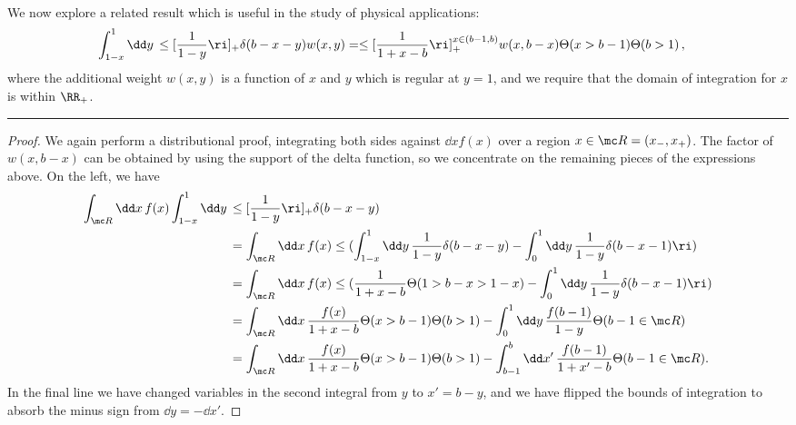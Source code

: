 ~\\
\begin{example}{}
    We now explore a related result which is useful in the study of physical applications:
    \begin{align}
        \int_{1-x}^{1} \dd y\,
        \le[\frac{1}{1-y}\ri]_+ \delta(b - x - y) w(x, y)
        &=
        \le[\frac{1}{1+x-b}\ri]^{x \in (b-1,b)}_+
        w(x, b-x)
        \Theta(x > b-1) \Theta(b > 1)
        \label{eq:mixed-bounds_1d_plus-distribution}
        \,,
    \end{align}
    where the additional weight \(w(x,y)\) is a function of \(x\) and \(y\) which is regular at \(y = 1\), and we require that the domain of integration for \(x\) is within \(\RR_+\).

\vspace{7pt}
\hrule
\vspace{7pt}

\begin{proof}
    We again perform a distributional proof, integrating both sides against \(\dd x f(x)\) over a region \(x \in \mc R = (x_-, x_+)\).
    The factor of \(w(x,b-x)\) can be obtained by using the support of the delta function, so we concentrate on the remaining pieces of the expressions above.
    On the left, we have
    \begin{align}
        \int_{\mc R} \dd x\, f(x)
        \int_{1-x}^{1} \dd y\,&
        \le[\frac{1}{1-y}\ri]_+ \delta(b - x - y)
        \\
        &=
        \notag
        \int_{\mc R} \dd x\,f(x)
        \le(
            \int_{1-x}^{1} \dd y\,
            \frac{1}{1-y}
            \delta(b - x - y)
            -
            \int_0^1 \dd y\,
            \frac{1}{1-y}
            \delta(b - x - 1)
        \ri)
        \\
        &=
        \notag
        \int_{\mc R} \dd x\,f(x)
        \le(
            \frac{1}{1+x-b}
            \Theta(1 > b - x > 1 - x)
            -
            \int_0^{1} \dd y\,
            \frac{1}{1-y}
            \delta(b - x - 1)
        \ri)
        \\
        &=
        \notag
        \int_{\mc R} \dd x\,\frac{f(x)}{1 + x - b}
        \Theta(x > b - 1)\Theta(b > 1)
        -
        \int_0^1 \dd y\,\frac{f(b-1)}{1-y}
        \Theta(b-1 \in \mc R)
        \\
        &=
        \notag
        \int_{\mc R} \dd x\,\frac{f(x)}{1 + x - b}
        \Theta(x > b - 1)\Theta(b > 1)
        -
        \int_{b-1}^b \dd x'\,\frac{f(b-1)}{1+x'-b}
        \Theta(b-1 \in \mc R)
        .
    \end{align}
    In the final line we have changed variables in the second integral from \(y\) to \(x' = b - y\), and we have flipped the bounds of integration to absorb the minus sign from \(\dd y = -\dd x'\).


\end{proof}
\end{example}
